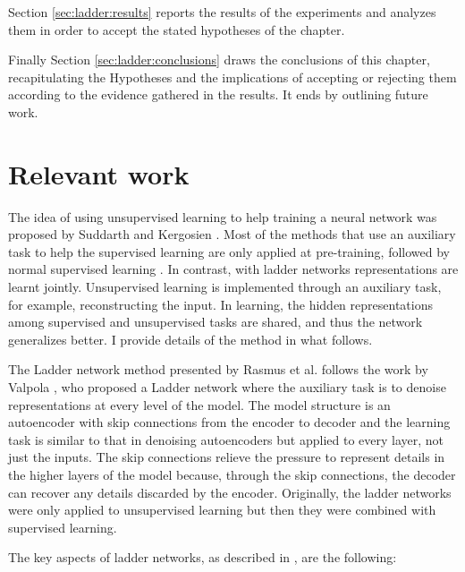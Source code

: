 Section \ref{sec:ladder:results} reports the results of the experiments and
analyzes them in order to accept the stated hypotheses of the chapter.

Finally Section \ref{sec:ladder:conclusions} draws the conclusions of this
chapter, recapitulating the Hypotheses and the implications of accepting or
rejecting them according to the evidence gathered in the results. It ends by
outlining future work.

\section{Relevant work}\label{sec:ladder:previous}

The idea of using unsupervised learning to help training a neural network was
proposed by Suddarth and Kergosien \cite{Suddarth1990}. Most of the methods
that use an auxiliary task to help the supervised learning are only applied at
pre-training, followed by normal supervised learning \cite{Hinton504}. In
contrast, with ladder networks \cite{Rasmus:2015aa} representations are learnt
jointly. Unsupervised learning is implemented through an auxiliary task, for
example, reconstructing the input. In learning, the hidden representations
among supervised and unsupervised tasks are shared, and thus the network
generalizes better. I provide details of the method in what follows.

The Ladder network method presented by Rasmus et al. follows the work by
Valpola \cite{Valpola:2014aa}, who proposed a Ladder network where the
auxiliary task is to denoise representations at every level of the model. The
model structure is an autoencoder with skip connections from the encoder to
decoder and the learning task is similar to that in denoising autoencoders but
applied to every layer, not just the inputs. The skip connections relieve the
pressure to represent details in the higher layers of the model because,
through the skip connections, the decoder can recover any details discarded by
the encoder. Originally, the ladder networks were only applied to unsupervised
learning \cite{Valpola:2014aa,Rasmus:2014aa} but then they were combined with
supervised learning.

The key aspects of ladder networks, as described in \cite{Rasmus:2015aa}, are
the following:

